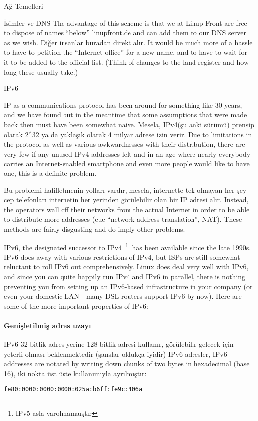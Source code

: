 \begin{section}{Ağ Temelleri}
\begin{subsection}{İsimler ve DNS}
The advantage of this scheme is that we at Linup Front are free to dispose of names “below” linupfront.de and can add them to our DNS server as we wish. Diğer insanlar buradan direkt alır.  It would be much more of a hassle to have to petition the “Internet office” for a new name, and to have to wait for it to be added to the official list. (Think of changes to the land register and how long these usually take.)

\end{subsection}
\begin{subsection}{IPv6}

IP as a communications protocol has been around for something like 30 years, and we have found out in the meantime that some assumptions that were made back then must have been somewhat naive. Mesela, IPv4(şu anki sürümü) prensip olarak 2$ ^\wedge $32 ya da yaklaşık olarak 4 milyar adrese izin verir. Due to limitations in the protocol as well as various awkwardnesses with their distribution, there are very few if any unused IPv4 addresses left and in an age where nearly everybody carries an Internet-enabled smartphone and even more people would like to have one, this is a definite problem.

Bu problemi hafifletmenin yolları vardır, mesela, internette tek olmayan her şey-cep telefonları  internetin her yerinden görülebilir olan bir IP adresi alır. Instead, the operators wall off their networks from the actual Internet in order to be able to distribute more addresses (cue “network address translation”, NAT). These methods are fairly disgusting and do imply other problems.

IPv6, the designated successor to IPv4\
\footnote{IPv5 asla varolmamaıştır}, has been available since the late 1990s. IPv6 does away with various restrictions of IPv4, but ISPs are still somewhat reluctant to roll IPv6 out comprehensively. Linux does deal very well with IPv6, and since you can quite happily run IPv4 and IPv6 in parallel, there is nothing preventing you from setting up an IPv6-based infrastructure in your company (or even your domestic LAN—many DSL routers support IPv6 by now). Here are some of the more important properties of IPv6:

\paragraph{Genişletilmiş adres uzayı}{ IPv6 32  bitlik adres yerine 128 bitlik adresi kullanır, görülebilir gelecek için yeterli olması beklenmektedir (şanslar oldukça iyidir) IPv6 adresler,  IPv6 addresses are notated by writing down chunks of two bytes in hexadecimal (base 16), iki nokta üst üste kullanımıyla ayrılmıştır:
\begin{verbatim}
fe80:0000:0000:0000:025a:b6ff:fe9c:406a
\end{verbatim}

}
\end{subsection}
\end{section}
